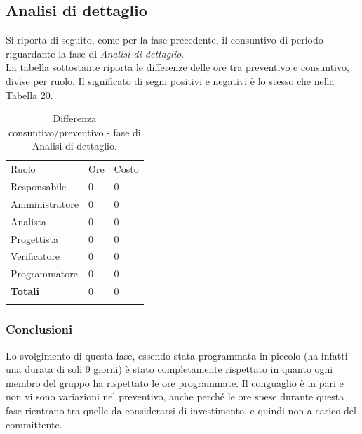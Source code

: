 \documentclass[a4paper]{article}
\begin{document}
		\subsection{Analisi di dettaglio}
			Si riporta di seguito, come per la fase precedente, il consuntivo di periodo riguardante la fase di \emph{Analisi di dettaglio}. \\
			La tabella sottostante riporta le differenze delle ore tra preventivo e consuntivo, divise per ruolo.
			Il significato di segni positivi e negativi è lo stesso che nella \hyperref[DCSceltaCapitolato]{Tabella 20}.
			
			\begin{table}[H]
				\begin{tabularx}{\textwidth}{Y Y Y}
					Ruolo & Ore & Costo \\
					Responsabile & 0 & 0 \\
					Amministratore & 0 & 0 \\
					Analista & 0 & 0\\
					Progettista & 0 & 0\\
					Verificatore & 0 & 0\\
					Programmatore & 0 & 0 \\
					\textbf{Totali} & 0 & 0 \\
				\end{tabularx}
				\caption{Differenza consuntivo/preventivo - fase di Analisi di dettaglio. } 
				\label{ConsuntivoDettaglio}
			\end{table}
			
			\subsubsection{Conclusioni}
				Lo svolgimento di questa fase, essendo stata programmata in piccolo (ha infatti una durata di soli 9 giorni) è stato
				completamente rispettato in quanto ogni membro del gruppo ha rispettato le ore programmate. Il conguaglio è in pari e non 
				vi sono variazioni nel preventivo, anche perché le ore spese durante questa fase rientrano tra quelle da considerarsi di 
				investimento, e quindi non a carico del committente. 
			
		
\end{document}
